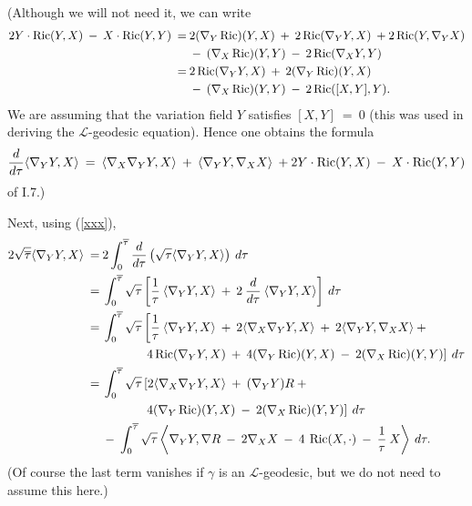 (Although we will not need it, we can write
\begin{align}
2 Y \cdot \operatorname{Ric}(Y, X) \: - \: X \cdot \operatorname{Ric}(Y, Y) \: = \: &
2 (\nabla_Y \operatorname{Ric})(Y, X) \: + \:
2 \operatorname{Ric}(\nabla_Y Y, X) \: + 2 \operatorname{Ric}(Y, \nabla_Y X) \\
& - \:
(\nabla_X \operatorname{Ric}) (Y, Y) \: - \:
2 \operatorname{Ric}(\nabla_X Y, Y) \notag \\
 = \: &
2 \operatorname{Ric} ( \nabla_Y Y, X ) \: + \:
2 (\nabla_Y \operatorname{Ric}) (Y, X) \notag \\
& - \:
(\nabla_X \operatorname{Ric}) (Y, Y) \: - \:
2 \operatorname{Ric}([X, Y], Y).
\notag
\end{align}
We are assuming that the variation field $Y$ satisfies $[X, Y] \: = \: 0$
(this was used in deriving the ${\mathcal L}$-geodesic equation).
Hence one obtains the formula
\begin{equation}
\frac{d}{d\tau} \langle \nabla_Y Y, X \rangle \: = \:
\langle \nabla_X \nabla_Y Y, X \rangle \: + \:
\langle \nabla_Y Y, \nabla_X X \rangle \: +
2 Y \cdot \operatorname{Ric}(Y, X) \: - \: X \cdot \operatorname{Ric}(Y, Y)
\end{equation}
of I.7.)

Next, using (\ref{xxx}),
\begin{align}
2 \sqrt{\overline{\tau}} \langle \nabla_Y Y, X \rangle \: = \: &
2 \int_0^{\overline{\tau}} \frac{d}{d\tau}
\left( \sqrt{\tau} \langle \nabla_Y Y, X \rangle  \right) \: d\tau \\
 = \: &
\int_0^{\overline{\tau}}
\sqrt{\tau} \left[ \frac{1}{\tau} \:
\langle \nabla_Y Y, X \rangle \: + \:
2  \:  \frac{d}{d\tau} \: \langle \nabla_Y Y, X \rangle \right]
\: d\tau \notag \\
\: = \: &
\int_0^{\overline{\tau}}
\sqrt{\tau} \left[ \frac{1}{\tau} \:
\langle \nabla_Y Y, X \rangle \: + \:
2 \langle \nabla_X \nabla_Y Y, X \rangle \: + \:
2 \langle \nabla_Y Y, \nabla_X X \rangle \: + \: \right. \notag \\
& \left.
\: \: \: \: \:\: \: \: \: \: \: \: \: \: \: 4 \operatorname{Ric} ( \nabla_Y Y, X ) \: + \:
4 (\nabla_Y \operatorname{Ric}) (Y, X) \: - \: 2
(\nabla_X \operatorname{Ric}) (Y, Y) \right] \: d\tau \notag \\
\: = \: &
\int_0^{\overline{\tau}}
\sqrt{\tau} \left[
2 \langle \nabla_X \nabla_Y Y, X \rangle \: + \:
(\nabla_Y Y) R \: + \: \right. \notag \\
& \left.
\: \: \: \: \: \: \: \: \: \: \: \: \: \: \:
4 (\nabla_Y \operatorname{Ric}) (Y, X) \: - \: 2
(\nabla_X \operatorname{Ric}) (Y, Y) \right] \: d\tau \notag \\
& - \:
\int_0^{\overline{\tau}}
\sqrt{\tau} \left\langle \nabla_Y Y,
\nabla R
\: - \: 2 \nabla_X X  \: - \: 4 \: \operatorname{Ric}(X, \cdot) \: -\: \frac{1}{\tau}
\: X
\right\rangle \: d\tau. \notag
\end{align}
(Of course the last term vanishes if $\gamma$ is an ${\mathcal L}$-geodesic,
but we do not need to assume this here.)

